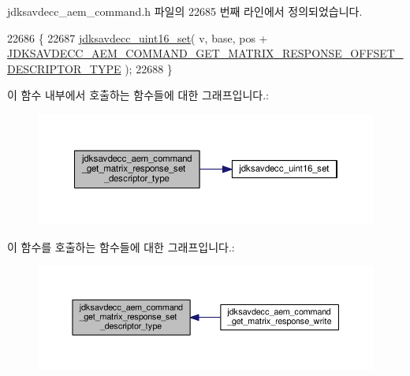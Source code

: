 jdksavdecc\+\_\+aem\+\_\+command.\+h 파일의 22685 번째 라인에서 정의되었습니다.


\begin{DoxyCode}
22686 \{
22687     \hyperlink{group__endian_ga14b9eeadc05f94334096c127c955a60b}{jdksavdecc\_uint16\_set}( v, base, pos + 
      \hyperlink{group__command__get__matrix__response_ga18b5d3b3fb2fb1bd896754f1f844db51}{JDKSAVDECC\_AEM\_COMMAND\_GET\_MATRIX\_RESPONSE\_OFFSET\_DESCRIPTOR\_TYPE}
       );
22688 \}
\end{DoxyCode}


이 함수 내부에서 호출하는 함수들에 대한 그래프입니다.\+:
\nopagebreak
\begin{figure}[H]
\begin{center}
\leavevmode
\includegraphics[width=350pt]{group__command__get__matrix__response_ga5d3bbb8b993435678aa79add5f92fd32_cgraph}
\end{center}
\end{figure}




이 함수를 호출하는 함수들에 대한 그래프입니다.\+:
\nopagebreak
\begin{figure}[H]
\begin{center}
\leavevmode
\includegraphics[width=350pt]{group__command__get__matrix__response_ga5d3bbb8b993435678aa79add5f92fd32_icgraph}
\end{center}
\end{figure}


